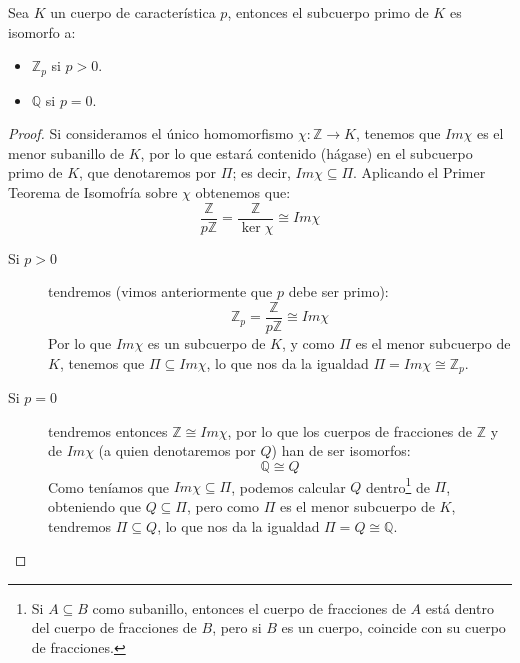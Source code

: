 \begin{prop}
    Sea $K$ un cuerpo de característica $p$, entonces el subcuerpo primo de $K$ es isomorfo a:
    \begin{itemize}
        \item $\mathbb{Z}_p$ si $p>0$.
        \item $\mathbb{Q}$ si $p = 0$.
    \end{itemize}
    \begin{proof}
        Si consideramos el único homomorfismo $\chi:\mathbb{Z}\to K$, tenemos que $Im\chi$ es el menor subanillo de $K$, por lo que estará contenido (hágase) en el subcuerpo primo de $K$, que denotaremos por $\Pi$; es decir, $Im\chi \subseteq \Pi$. Aplicando el Primer Teorema de Isomofría sobre $\chi$ obtenemos que:
        \begin{equation*}
            \dfrac{\mathbb{Z}}{p\mathbb{Z}} = \dfrac{\mathbb{Z}}{\ker\chi} \cong Im\chi 
        \end{equation*}
        \begin{description}
            \item [Si $p>0$] tendremos (vimos anteriormente que $p$ debe ser primo):
                \begin{equation*}
                    \mathbb{Z}_p = \dfrac{\mathbb{Z}}{p\mathbb{Z}} \cong Im\chi
                \end{equation*}
                Por lo que $Im\chi$ es un subcuerpo de $K$, y como $\Pi$ es el menor subcuerpo de $K$, tenemos que $\Pi\subseteq Im\chi$, lo que nos da la igualdad $\Pi = Im\chi \cong \mathbb{Z}_p$.
            \item [Si $p=0$] tendremos entonces $\mathbb{Z}\cong Im\chi$, por lo que los cuerpos de fracciones de $\mathbb{Z}$ y de $Im\chi$ (a quien denotaremos por $Q$) han de ser isomorfos:
                \begin{equation*}
                    \mathbb{Q}\cong Q
                \end{equation*}
                Como teníamos que $Im\chi \subseteq \Pi$, podemos calcular $Q$ dentro\footnote{Si $A\subseteq B$ como subanillo, entonces el cuerpo de fracciones de $A$ está dentro del cuerpo de fracciones de $B$, pero si $B$ es un cuerpo, coincide con su cuerpo de fracciones.} de $\Pi$, obteniendo que $Q\subseteq \Pi$, pero como $\Pi$ es el menor subcuerpo de $K$, tendremos $\Pi\subseteq Q$, lo que nos da la igualdad $\Pi = Q \cong \mathbb{Q}$.\qedhere
        \end{description}
    \end{proof}
\end{prop}

